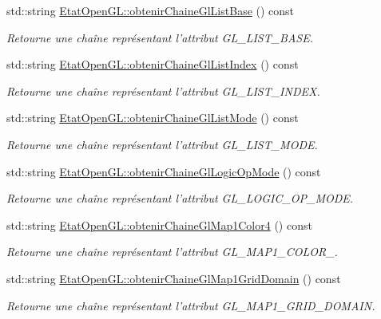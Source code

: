 \begin{DoxyCompactItemize}
std\-::string \hyperlink{group__utilitaire_ga869ac6c34aaec533fb74b4e8095ae993}{Etat\-Open\-G\-L\-::obtenir\-Chaine\-Gl\-List\-Base} () const 
\begin{DoxyCompactList}\small\item\em Retourne une chaîne représentant l'attribut G\-L\-\_\-\-L\-I\-S\-T\-\_\-\-B\-A\-S\-E. \end{DoxyCompactList}\item 
std\-::string \hyperlink{group__utilitaire_ga4486b4e688ef8a216e16b7c1a6ec7a61}{Etat\-Open\-G\-L\-::obtenir\-Chaine\-Gl\-List\-Index} () const 
\begin{DoxyCompactList}\small\item\em Retourne une chaîne représentant l'attribut G\-L\-\_\-\-L\-I\-S\-T\-\_\-\-I\-N\-D\-E\-X. \end{DoxyCompactList}\item 
std\-::string \hyperlink{group__utilitaire_ga75eb73d049c2865922e414f5a06b749a}{Etat\-Open\-G\-L\-::obtenir\-Chaine\-Gl\-List\-Mode} () const 
\begin{DoxyCompactList}\small\item\em Retourne une chaîne représentant l'attribut G\-L\-\_\-\-L\-I\-S\-T\-\_\-\-M\-O\-D\-E. \end{DoxyCompactList}\item 
std\-::string \hyperlink{group__utilitaire_gaf88292802715427e1a4e58f591b8e67e}{Etat\-Open\-G\-L\-::obtenir\-Chaine\-Gl\-Logic\-Op\-Mode} () const 
\begin{DoxyCompactList}\small\item\em Retourne une chaîne représentant l'attribut G\-L\-\_\-\-L\-O\-G\-I\-C\-\_\-\-O\-P\-\_\-\-M\-O\-D\-E. \end{DoxyCompactList}\item 
std\-::string \hyperlink{group__utilitaire_gaa3e13a4accbc22c40a52ee9cee9fc3e0}{Etat\-Open\-G\-L\-::obtenir\-Chaine\-Gl\-Map1\-Color4} () const 
\begin{DoxyCompactList}\small\item\em Retourne une chaîne représentant l'attribut G\-L\-\_\-\-M\-A\-P1\-\_\-\-C\-O\-L\-O\-R\-\_. \end{DoxyCompactList}\item 
std\-::string \hyperlink{group__utilitaire_gad05cd2af4f512deb88aca0b00b0815c4}{Etat\-Open\-G\-L\-::obtenir\-Chaine\-Gl\-Map1\-Grid\-Domain} () const 
\begin{DoxyCompactList}\small\item\em Retourne une chaîne représentant l'attribut G\-L\-\_\-\-M\-A\-P1\-\_\-\-G\-R\-I\-D\-\_\-\-D\-O\-M\-A\-I\-N. \end{DoxyCompactList}\item 

\end{DoxyCompactItemize}
